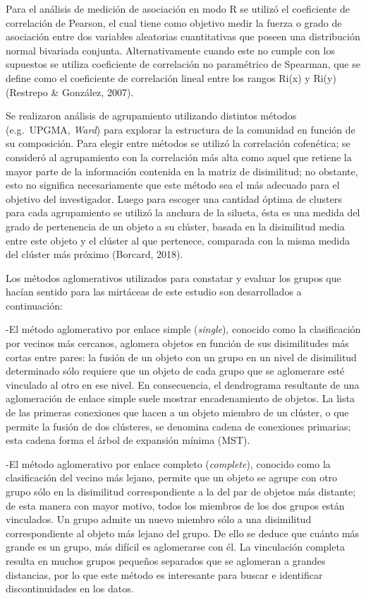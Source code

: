 \documentclass[11pt,]{article}
\begin{document}
Para el análisis de medición de asociación en modo R se utilizó el
coeficiente de correlación de Pearson, el cual tiene como objetivo medir
la fuerza o grado de asociación entre dos variables aleatorias
cuantitativas que poseen una distribución normal bivariada conjunta.
Alternativamente cuando este no cumple con los supuestos se utiliza
coeficiente de correlación no paramétrico de Spearman, que se define
como el coeficiente de correlación lineal entre los rangos Ri(x) y Ri(y)
(Restrepo \& González, 2007).

Se realizaron análisis de agrupamiento utilizando distintos métodos
(e.g.~UPGMA, \emph{Ward}) para explorar la estructura de la comunidad en
función de su composición. Para elegir entre métodos se utilizó la
correlación cofenética; se consideró al agrupamiento con la correlación
más alta como aquel que retiene la mayor parte de la información
contenida en la matriz de disimilitud; no obstante, esto no significa
necesariamente que este método sea el más adecuado para el objetivo del
investigador. Luego para escoger una cantidad óptima de clusters para
cada agrupamiento se utilizó la anchura de la silueta, ésta es una
medida del grado de pertenencia de un objeto a su clúster, basada en la
disimilitud media entre este objeto y el clúster al que pertenece,
comparada con la misma medida del clúster más próximo (Borcard, 2018).

Los métodos aglomerativos utilizados para constatar y evaluar los grupos
que hacían sentido para las mirtáceas de este estudio son desarrollados
a continuación:

-El método aglomerativo por enlace simple (\emph{single}), conocido como
la clasificación por vecinos más cercanos, aglomera objetos en función
de sus disimilitudes más cortas entre pares: la fusión de un objeto con
un grupo en un nivel de disimilitud determinado sólo requiere que un
objeto de cada grupo que se aglomerare esté vinculado al otro en ese
nivel. En consecuencia, el dendrograma resultante de una aglomeración de
enlace simple suele mostrar encadenamiento de objetos. La lista de las
primeras conexiones que hacen a un objeto miembro de un clúster, o que
permite la fusión de dos clústeres, se denomina cadena de conexiones
primarias; esta cadena forma el árbol de expansión mínima (MST).

-El método aglomerativo por enlace completo (\emph{complete}), conocido
como la clasificación del vecino más lejano, permite que un objeto se
agrupe con otro grupo sólo en la disimilitud correspondiente a la del
par de objetos más distante; de esta manera con mayor motivo, todos los
miembros de los dos grupos están vinculados. Un grupo admite un nuevo
miembro sólo a una disimilitud correspondiente al objeto más lejano del
grupo. De ello se deduce que cuánto más grande es un grupo, más difícil
es aglomerarse con él. La vinculación completa resulta en muchos grupos
pequeños separados que se aglomeran a grandes distancias, por lo que
este método es interesante para buscar e identificar discontinuidades en
los datos.
\end{document}
